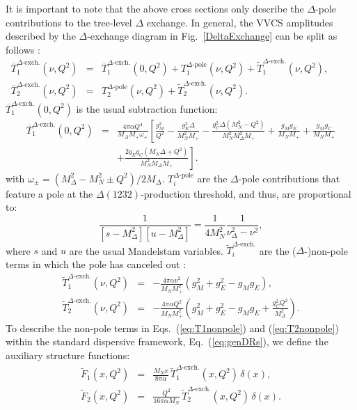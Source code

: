\documentclass[12pt,preprint,tightenlines,
showpacs,preprintnumbers,amsmath,amssymb,
a4paper,nofootinbib]{revtex4-2}
\def\beq{\begin{equation}}
\def\eeq{\end{equation}}
\def\bea{\begin{eqnarray}}
\def\eea{\end{eqnarray}}
\def\eqlab#1{\label{eq:#1}}
\def\Eqref#1{Eq.~(\ref{eq:#1})}
\def\al{\alpha}
\def\nn{\nonumber}
\def\ol#1{\overline{#1}}
\begin{document}
It is important to note that the above cross sections only describe the $\Delta$-pole contributions to the tree-level $\Delta$ exchange. In general, the VVCS amplitudes described by the $\Delta$-exchange diagram in Fig.~\ref{DeltaExchange} can be split as follows \cite{Hagelstein:2018bdi}:
\begin{subequations}
\bea
\ol T_1^{\Delta\text{-exch.}}(\nu,Q^2)&=&\ol T_1^{\Delta\text{-exch.}}(0,Q^2)+T_1^{\Delta\text{-pole}}(\nu,Q^2)+\widetilde T_1^{\Delta\text{-exch.}}(\nu,Q^2),\qquad\;\\
\ol T_2^{\Delta\text{-exch.}}(\nu,Q^2)&=&T_2^{\Delta\text{-pole}}(\nu,Q^2)+\widetilde T_2^{\Delta\text{-exch.}}(\nu,Q^2).
\eea
\end{subequations}
$\ol T_1^{\Delta\text{-exch.}}(0,Q^2)$ is the usual subtraction function:
\bea
\ol T_1^{\Delta\text{-exch.}}(0,Q^2)&=&\frac{4\pi \al Q^4}{M_\Delta M_+ \omega_+}\left[\frac{g_M^2}{Q^2}-\frac{g_E^2 \varDelta}{M_N^2 M_+}-\frac{g_C^2 \varDelta \left(M_N^2-Q^2\right)}{M_N^2 M_\Delta^2 M_+}+\frac{g_M g_E}{M_N M_+}+\frac{g_M g_C}{M_N M_+}\right.\eqlab{T1su}\\
&&+\left.\frac{2 g_E g_C \left(M_N\varDelta +Q^2\right)}{M_N^2 M_\Delta M_+}\right].\nn
\eea
with  $\omega_\pm=(M_\Delta^2-M_N^2\pm Q^2)/2M_\Delta$. $T_i^{\Delta\text{-pole}}$ are the $\Delta$-pole contributions that feature a pole at the $\Delta(1232)$-production threshold, and thus, are proportional to:
\beq
\frac{1}{[s-M_\Delta^2][u-M_\Delta^2]}=\frac{1}{4M_N^2}\frac{1}{\nu_\Delta^2-\nu^2}, \eqlab{poleStruc}
\eeq
 where $s$ and $u$ are the usual Mandelstam variables. $\widetilde T_i^{\Delta\text{-exch.}}$ are the ($\Delta$-)non-pole terms in which the pole has canceled out \cite{Hagelstein:2018bdi}:
 \begin{subequations}
 \bea
\widetilde T_1^{\Delta\text{-exch.}}(\nu,Q^2)&=&-\frac{4\pi \al  \nu^2}{M_N M_+^2}\left(g_M^2+g_E^2-g_M g_E\right),\eqlab{T1nonpole}\\
\widetilde T_2^{\Delta\text{-exch.}}(\nu,Q^2)&=&-\frac{4\pi \al Q^2}{M_N M_+^2}\left(g_M^2+g_E^2-g_M g_E+\frac{g_C^2 Q^2}{M_\Delta^2}\right).\eqlab{T2nonpole}
\eea
\end{subequations}
 To describe the non-pole terms in Eqs.~(\ref{eq:T1nonpole}) and (\ref{eq:T2nonpole}) within the standard dispersive framework, \Eqref{genDRs}, we define the auxiliary structure functions:
 \begin{subequations}
\bea
\widetilde F_1(x,Q^2)&=&\frac{M_N x}{8 \pi \al} \,\widetilde T_1^{\Delta\text{-exch.}}(x,Q^2)\, \delta (x),\\
\widetilde F_2(x,Q^2)&=&\frac{Q^2}{16 \pi \al M_N} \,\widetilde T_2^{\Delta\text{-exch.}}(x,Q^2)\, \delta (x).
\eea
\end{subequations}
\end{document}
